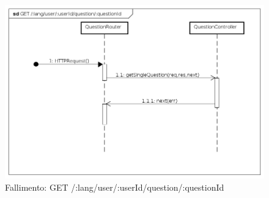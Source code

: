 \begin{itemize}
\begin{figure}[ht]
	\centering
	\includegraphics[scale=0.45]{UML/DiagrammiDiSequenza/Back-end/GET__lang_user__userId_question__questionId_failure.png}
	\caption{Fallimento: GET /:lang/user/:userId/question/:questionId}
\end{figure}
\FloatBarrier

\end{itemize}






